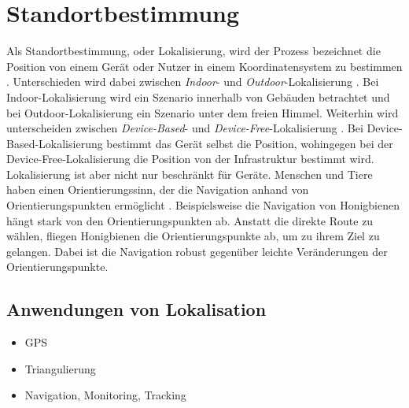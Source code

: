 \chapter{Standortbestimmung}
Als Standortbestimmung, oder Lokalisierung, wird der Prozess bezeichnet die Position von einem Gerät oder Nutzer in einem Koordinatensystem zu bestimmen \cite{bulusu2000gps}.
Unterschieden wird dabei zwischen \textit{Indoor}- und \textit{Outdoor}-Lokalisierung \cite{zafari2019survey, bulusu2000gps}.
Bei Indoor-Lokalisierung wird ein Szenario innerhalb von Gebäuden betrachtet und bei Outdoor-Lokalisierung ein Szenario unter dem freien Himmel.
\newline
\newline
Weiterhin wird unterscheiden zwischen \textit{Device-Based}- und \textit{Device-Free}-Lokalisierung \cite{xiao2016survey}.
Bei Device-Based-Lokalisierung bestimmt das Gerät selbst die Position, wohingegen bei der Device-Free-Lokalisierung
die Position von der Infrastruktur bestimmt wird.
\newline
\newline
Lokalisierung ist aber nicht nur beschränkt für Geräte.
Menschen und Tiere haben einen Orientierungssinn, der die Navigation anhand von Orientierungspunkten ermöglicht \cite{menzel1996knowledge}.
Beispielsweise die Navigation von Honigbienen hängt stark von den Orientierungspunkten ab.
Anstatt die direkte Route zu wählen, fliegen Honigbienen die Orientierungspunkte ab, um zu ihrem Ziel zu gelangen.
Dabei ist die Navigation robust gegenüber leichte Veränderungen der Orientierungspunkte.

\section{Anwendungen von Lokalisation}
\begin{itemize}
    \item GPS
    \item Triangulierung
    \item Navigation, Monitoring, Tracking
\end{itemize}



